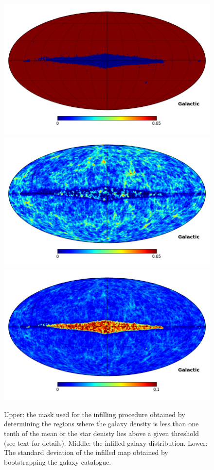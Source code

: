 \documentclass[useAMS,usenatbib]{mn2e}
\begin{document}
\begin{figure}
  \includegraphics[width=\columnwidth,clip,trim=0 1in 0 0]{prod_mask}
  \includegraphics[width=\columnwidth]{infilled_prod_mask}
  \includegraphics[width=\columnwidth]{sigma_prod_mask}
  \caption{Upper: the mask used for the infilling procedure obtained
    by determining the regions where the galaxy density is less than
    one tenth of the mean or the star denisty lies above a given
    threshold (see text for details).  Middle: the infilled galaxy
    distribution. Lower: The standard deviation of the infilled map
    obtained by bootstrapping the galaxy catalogue.}
  \label{fig:infilling}
\end{figure}
\end{document}
